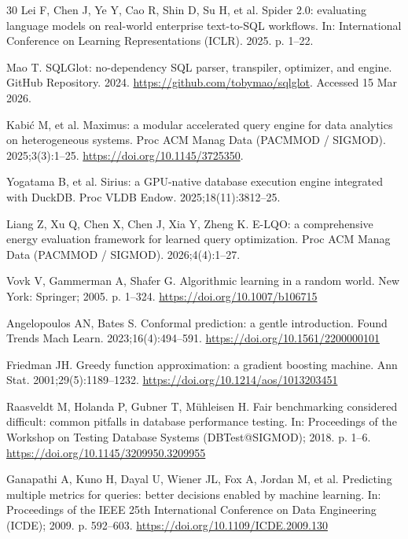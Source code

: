 \documentclass[10pt,a4paper]{article}
\begin{document}
{\begin{thebibliography}{30}
Lei F, Chen J, Ye Y, Cao R, Shin D, Su H, et al. Spider 2.0: evaluating language models on real-world enterprise text-to-SQL workflows. In: International Conference on Learning Representations (ICLR). 2025. p. 1--22.

Mao T. SQLGlot: no-dependency SQL parser, transpiler, optimizer, and engine. GitHub Repository. 2024. \url{https://github.com/tobymao/sqlglot}. Accessed 15 Mar 2026.

 Kabi\'{c} M, et al. Maximus: a modular accelerated query engine for data analytics on heterogeneous systems. Proc ACM Manag Data (PACMMOD / SIGMOD). 2025;3(3):1--25. \url{https://doi.org/10.1145/3725350}.

 Yogatama B, et al. Sirius: a GPU-native database execution engine integrated with DuckDB. Proc VLDB Endow. 2025;18(11):3812--25.

 Liang Z, Xu Q, Chen X, Chen J, Xia Y, Zheng K. E-LQO: a comprehensive energy evaluation framework for learned query optimization. Proc ACM Manag Data (PACMMOD / SIGMOD). 2026;4(4):1--27.

Vovk V, Gammerman A, Shafer G. Algorithmic learning in a random world. New York: Springer; 2005. p. 1--324. \url{https://doi.org/10.1007/b106715}

Angelopoulos AN, Bates S. Conformal prediction: a gentle introduction. Found Trends Mach Learn. 2023;16(4):494--591. \url{https://doi.org/10.1561/2200000101}

Friedman JH. Greedy function approximation: a gradient boosting machine. Ann Stat. 2001;29(5):1189--1232. \url{https://doi.org/10.1214/aos/1013203451}

Raasveldt M, Holanda P, Gubner T, M{\"u}hleisen H. Fair benchmarking considered difficult: common pitfalls in database performance testing. In: Proceedings of the Workshop on Testing Database Systems (DBTest@SIGMOD); 2018. p. 1--6. \url{https://doi.org/10.1145/3209950.3209955}

Ganapathi A, Kuno H, Dayal U, Wiener JL, Fox A, Jordan M, et al. Predicting multiple metrics for queries: better decisions enabled by machine learning. In: Proceedings of the IEEE 25th International Conference on Data Engineering (ICDE); 2009. p. 592--603. \url{https://doi.org/10.1109/ICDE.2009.130}


\end{thebibliography}}
\end{document}
